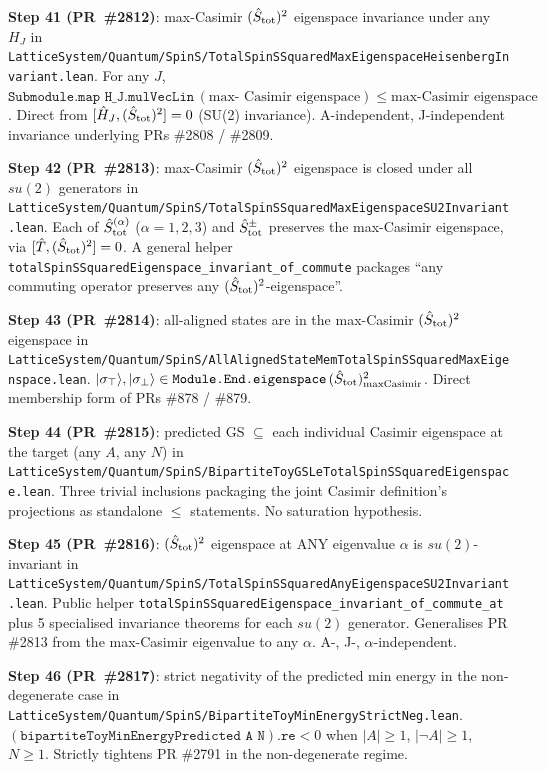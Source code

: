 \documentclass[a4paper,11pt]{article}
\begin{document}
\textbf{Step 41 (PR~\#2812)}: max-Casimir $(\hat S_{\rm tot})^2$
eigenspace invariance under any $H_J$ in
\texttt{LatticeSystem/Quantum/SpinS/TotalSpinSSquaredMaxEigenspaceHeisenbergInvariant.lean}.
For any $J$, $\texttt{Submodule.map H\_J.mulVecLin}\,(\text{max-
Casimir eigenspace}) \le \text{max-Casimir eigenspace}$. Direct
from $[\hat H_J, (\hat S_{\rm tot})^2] = 0$ (SU(2) invariance).
A-independent, J-independent invariance underlying PRs \#2808 /
\#2809.

\textbf{Step 42 (PR~\#2813)}: max-Casimir $(\hat S_{\rm tot})^2$
eigenspace is closed under all $su(2)$ generators in
\texttt{LatticeSystem/Quantum/SpinS/TotalSpinSSquaredMaxEigenspaceSU2Invariant.lean}.
Each of $\hat S^{(\alpha)}_{\rm tot}$ ($\alpha = 1, 2, 3$) and
$\hat S^\pm_{\rm tot}$ preserves the max-Casimir eigenspace, via
$[\hat T, (\hat S_{\rm tot})^2] = 0$. A general helper
\texttt{totalSpinSSquaredEigenspace\_invariant\_of\_commute}
packages ``any commuting operator preserves any
$(\hat S_{\rm tot})^2$-eigenspace''.

\textbf{Step 43 (PR~\#2814)}: all-aligned states are in the
max-Casimir $(\hat S_{\rm tot})^2$ eigenspace in
\texttt{LatticeSystem/Quantum/SpinS/AllAlignedStateMemTotalSpinSSquaredMaxEigenspace.lean}.
$|\sigma_\top\rangle, |\sigma_\bot\rangle \in
\texttt{Module.End.eigenspace}\,(\hat S_{\rm tot})^2_{\rm
maxCasimir}$. Direct membership form of PRs \#878 / \#879.

\textbf{Step 44 (PR~\#2815)}: predicted GS $\subseteq$ each
individual Casimir eigenspace at the target (any $A$, any $N$) in
\texttt{LatticeSystem/Quantum/SpinS/BipartiteToyGSLeTotalSpinSSquaredEigenspace.lean}.
Three trivial inclusions packaging the joint Casimir definition's
projections as standalone $\le$ statements. No saturation
hypothesis.

\textbf{Step 45 (PR~\#2816)}: $(\hat S_{\rm tot})^2$ eigenspace at
ANY eigenvalue $\alpha$ is $su(2)$-invariant in
\texttt{LatticeSystem/Quantum/SpinS/TotalSpinSSquaredAnyEigenspaceSU2Invariant.lean}.
Public helper \texttt{totalSpinSSquaredEigenspace\_invariant\_of\_commute\_at}
plus 5 specialised invariance theorems for each $su(2)$ generator.
Generalises PR \#2813 from the max-Casimir eigenvalue to any
$\alpha$. A-, J-, $\alpha$-independent.

\textbf{Step 46 (PR~\#2817)}: strict negativity of the predicted
min energy in the non-degenerate case in
\texttt{LatticeSystem/Quantum/SpinS/BipartiteToyMinEnergyStrictNeg.lean}.
$(\texttt{bipartiteToyMinEnergyPredicted A N}).\texttt{re} < 0$
when $|A| \ge 1$, $|\neg A| \ge 1$, $N \ge 1$. Strictly tightens
PR \#2791 in the non-degenerate regime.
\end{document}
